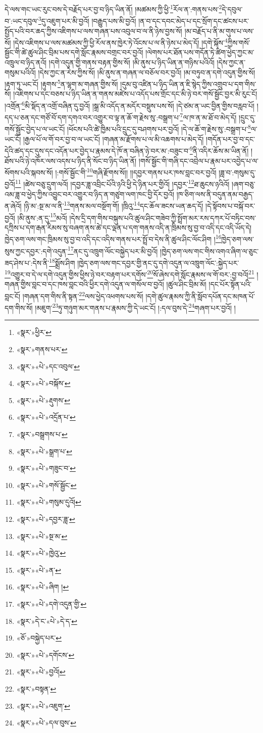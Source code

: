 དེ་ལས་གང་ཡང་རུང་བས་དེ་བརྗོད་པར་བྱ་བ་ཉིད་ཡིན་ནོ། །མཚམས་ཀྱི་ཕྱི་\footnote{«སྣར་»ཕྱིར་}རོལ་ན་:གནས་པས་\footnote{«སྣར་»གནས་པར་}དེ་དབུལ་བ་:ཡང་དབུལ་\footnote{«སྣར་»«པེ་»དང་འབུལ་}དུ་འཇུག་པར་མི་བྱའོ། །བརྒྱུད་པས་མི་བྱའོ། །ན་བ་དང་དབང་མེད་པ་དང་སྲོག་དང་ཚངས་པར་སྤྱོད་པའི་བར་ཆད་ཀྱིས་འཇིགས་པ་ལས་གཞན་པས་འབུལ་བ་ལ་ནི་ཉེས་བྱས་སོ། །མ་བརྗོད་པ་ནི་མ་གུས་པ་ལས་སོ། །དེས་འཇིགས་པ་ལས་མཚམས་ཀྱི་ཕྱི་རོལ་ནས་ཁྱེར་ཏེ་འོངས་པ་ལ་ནི་ཉེས་པ་མེད་དོ། །དགེ་སྐོས་\footnote{«སྣར་»«པེ་»བསྐོས་}ཀྱིས་གསོ་སྦྱོང་གི་ཚེ་ཚུལ་ཤིང་བྲིམ་པས་དགེ་སློང་རྣམས་བགྲང་བར་བྱའོ། །ལེགས་པར་ཐོན་པས་གདོན་ཏེ་ཚིག་ཕྱེད་ཀྱང་མ་འཁྲུལ་བ་ཉིད་ནའོ། །དགེ་འདུན་གྱི་གནས་བརྟན་གྱིས་སོ། །མི་ནུས་པ་ཉིད་ཡིན་ན་གཉིས་པའིའོ། །དེས་ཀྱང་ན་གསུམ་པའིའོ། །དེས་ཀྱང་ན་རེས་ཀྱིས་སོ། །མི་ནུས་ན་གཞན་ལ་བཅོལ་བར་བྱའོ། །མ་བཏུབ་ན་དགེ་འདུན་གྱིས་སོ། །རྟག་ཏུ་ཡང་ངོ། །རྟུགས་\footnote{«སྣར་»«པེ་»རྡུགས་}ན་ལྷག་མ་གཞན་གྱིས་སོ། །དུམ་བུ་འཛིན་པ་ཉིད་ཡིན་ན་ཇི་སྙེད་ཀྱིས་འགྲུབ་པ་དག་གིས་སོ། །འཇིགས་པ་དང་བཅས་པ་ཉིད་ཡིན་ན་གནས་མཛེས་པ་འདོད་པས་གྲོང་དང་མི་ཉེ་བར་གསོ་སྦྱོང་བྱར་མི་རུང་ངོ། །འགྲོན་\footnote{«སྣར་»«པེ་»འདྲོན་པ་}མི་སྡོད་ན་འགྲོ་བཞིན་དུ་བྱའོ། །སྒྲ་མི་འདོད་ན་མདོར་བསྡུས་པས་སོ། །དེ་ཙམ་ན་ཡང་བྱིན་གྱིས་བརླབ་པོ། །དད་པ་ཅན་དང་གཙོ་བོ་དག་དགའ་བར་འགྱུར་བ་ལྟ་ན་ཆོ་ག་རྗེས་སུ་:བསྒྲག་པ་\footnote{«སྣར་»བསྒྲགས་པ་}ལ་ཁ་ན་མ་ཐོ་བ་མེད་དོ། །དྲུང་དུ་གསོ་སྦྱོང་བྱེད་པ་ལ་ཡང་ངོ། །ཕོངས་པའི་ཚེ་ཁྱིམ་པའི་དྲུང་དུ་བཤགས་པར་བྱའོ། །དེ་ལ་ཆོ་ག་རྗེས་སུ་:བསྒྲག་པ་\footnote{«སྣར་»«པེ་»སྒྲག་པ་}ལ་ཡང་ངོ། །རྒྱལ་པོ་ལ་གོ་བར་བྱ་བ་ལ་ཡང་ངོ། །གཞན་མ་རྫོགས་པ་ལ་མི་འཆགས་པ་མེད་དོ། །གདོན་པར་བྱ་བ་དང་དེའི་ཚད་དང་དུས་དང་འདོན་པར་བྱེད་པ་རྣམས་དེ་ཁོ་ན་བཞིན་ཉེ་བར་མ་:བཟུང་བ་\footnote{«སྣར་»«པེ་»གཟུང་བ་}ནི་འདིར་ཆོས་མ་ཡིན་ནོ། །ཐོས་པའི་ཉེ་འཁོར་ལས་འདས་པ་ཉིད་ནི་སོང་བ་ཉིད་ཡིན་ནོ། །གསོ་སྦྱོང་གི་གཞི་དང་འབྲེལ་པ་རྣམ་པར་འབྱེད་པ་ལ་སོགས་པའི་སྐབས་སོ། །:གསོ་སྦྱོང་གི་\footnote{«སྣར་»«པེ་»གསོ་སྦྱོང་}གཞི་རྫོགས་སོ།། །།དབྱར་གནས་པར་ཁས་བླང་བར་བྱའོ། །ཟླ་བ་:གསུམ་དུ་བྱའོ།\footnote{«སྣར་»«པེ་»གསུམ་དུའོ།} །ཚེས་བཅུ་དྲུག་ལའོ། །དབྱར་ཟླ་འབྲིང་པོའི་ཉའི་ཕྱི་དེ་ཉིན་པར་གྱིའོ། །དབྱར་\footnote{«སྣར་»«པེ་»དབྱར་ཟླ་}ཐ་ཆུངས་ཉའིའོ། །ཞག་བཅུ་འམ་ཟླ་བ་ཕྱེད་ཀྱིས་འབྱུང་བར་འགྱུར་བ་ཉིད་ན་གཙུག་ལག་ཁང་བྱི་དོར་བྱའོ། །ཁ་ཅིག་ལས་ནི་བདུན་ནམ་བརྒྱད་ན་ཞེའོ། །ཉི་མ་:སྔ་མ་ལ་ནི་\footnote{«སྣར་»«པེ་»སྔ་མ་}གནས་མལ་བསྔོག་གོ། །ཁྲིའུ་\footnote{«སྣར་»«པེ་»ཁྱེའུ་}དང་ཆོལ་ཟངས་ཡན་ཆད་དོ། །དེ་སྟོབས་པ་བསྐོ་བར་བྱའོ། །མི་ནུས་:ན་དུ་\footnote{«སྣར་»«པེ་»ན་}མའོ། །དེས་དྲི་དག་གིས་བསྐུས་པའི་ཚུལ་ཤིང་གཟེབ་ཀྱི་སྤྲོག་མར་རས་དཀར་པོ་བཏིང་བས་དཀྲིས་པ་དག་རྒན་རིམས་སུ་བཞག་ནས་ཚེ་དང་ལྡན་པ་དག་གནས་འདི་ན་ཁྲིམས་སུ་བྱ་བ་འདི་དང་འདི་ཡོད་དེ། ཁྱེད་ཅག་ལས་གང་ཁྲིམས་སུ་བྱ་བ་འདི་དང་འདིས་གནས་པར་སྤྲོ་བ་དེས་ནི་ཚུལ་ཤིང་ལོང་ཤིག །\footnote{«སྣར་»«པེ་»ཞིག །}ཁྱེད་ཅག་ལས་སུས་ཀྱང་དབྱར་:དགེ་འདུན་\footnote{«སྣར་»«པེ་»དགེ་འདུན་གྱི་}ནང་དུ་འཁྲུག་ལོང་བསྐྱེད་པར་མི་བྱའོ། །ཁྱེད་ཅག་ལས་གང་གིས་འགའ་ཞིག་ལ་ཅུང་ཟད་ཤེས་པ་:དེས་ནི་\footnote{«སྣར་»དེ་ང་«པེ་»དེ་ད་}སྨྲོས་ཤིག །ཁྱེད་ཅག་ལས་གང་དབྱར་གྱི་ནང་དུ་དགེ་འདུན་ལ་འཁྲུག་ལོང་:སྐྱེད་པར་\footnote{«ཅོ་»བསྐྱེད་པར་}འགྱུར་བ་དེ་ལ་དགེ་འདུན་གྱིས་ཕྱིས་ཉེ་བར་བརྟག་པར་དགོས་\footnote{«སྣར་»«པེ་»དགོངས་}སོ་ཞེས་དགེ་སློང་རྣམས་ལ་གོ་བར་:བྱ་བའོ།\footnote{«སྣར་»«པེ་»བྱའོ།} །གཞན་གྱིས་བླང་བ་དང་ཁས་བླང་བའི་ཕྱིར་དགེ་འདུན་ལ་གསོལ་བ་བྱའོ། །ཚུལ་ཤིང་བྲིམ་མོ། །དང་པོར་སྟོན་པའི་བླང་ངོ། །གཞན་དག་གིས་ནི་སྟན་\footnote{«སྣར་»བསྟན་}ལས་ཕྱེད་འཕགས་པས་སོ། །དགེ་ཚུལ་རྣམས་ཀྱི་ནི་སློབ་དཔོན་དང་མཁན་པོ་དག་གིས་སོ། །མཇུག་\footnote{«སྣར་»«པེ་»འཇུག་}ཏུ་གཉུག་མར་གནས་པ་རྣམས་ཀྱི་དེ་ཡང་ངོ། །:དལ་བུས་དེ་\footnote{«སྣར་»«པེ་»དལ་བུས་}གཞག་པར་བྱའོ། །

